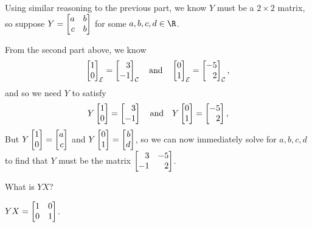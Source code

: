 \documentclass{problemset}
\begin{document}
\begin{parts}
\begin{solution}
				Using similar reasoning to the previous part, we know $Y$ must be
				a $2\times2$ matrix, so suppose $Y=\mat{a&b\\c&b}$ for some
				$a,b,c,d\in\R$.

				From the second part above, we know
				\[
					\mat{1\\0}_{\mathcal E} = \mat{3\\-1}_{\mathcal C}
					\quad \text{and} \quad
					\mat{0\\1}_{\mathcal E} = \mat{-5\\2}_{\mathcal C},
				\]
				and so we need $Y$ to satisfy
				\[
					Y\mat{1\\0}=\mat{3\\-1}
					\quad \text{and} \quad
					Y\mat{0\\1}=\mat{-5\\2},
				\]
				But $Y\mat{1\\0}=\mat{a\\c}$ and $Y\mat{0\\1}=\mat{b\\d}$, so we
				can now immediately solve for $a,b,c,d$ to find that $Y$ must be
				the matrix $\mat{3&-5\\-1&2}$.
			\end{solution}
		\item What is $YX$?
			\begin{solution}
				$YX = \mat{1&0\\0&1}$.
			\end{solution}
	\end{parts}
\end{document}
